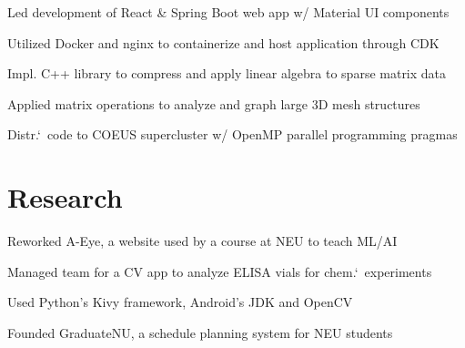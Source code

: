 \documentclass[letterpaper]{cv} %
\begin{document}
\begin{minipage}[t]{0.66\textwidth}

  \begin{tightitemize}
    \item Led development of React \& Spring Boot web app w/ Material UI components
    \item Utilized Docker and nginx to containerize and host application through CDK
  \end{tightitemize}
  \sectionspace


  \begin{tightitemize}
    \item Impl. C++ library to compress and apply linear algebra to sparse matrix data
    \item Applied matrix operations to analyze and graph large 3D mesh structures
    \item Distr.`\ code to COEUS supercluster w/ OpenMP parallel programming pragmas
  \end{tightitemize}

  \section{Research}


  \begin{tightitemize}
    \item Reworked A-Eye, a website used by a course at NEU to teach ML/AI
    \item Managed team for a CV app to analyze ELISA vials for chem.`\ experiments
    \item Used Python's Kivy framework, Android's JDK and OpenCV
    \item Founded GraduateNU, a schedule planning system for NEU students
  \end{tightitemize}


\end{minipage}
\end{document}
